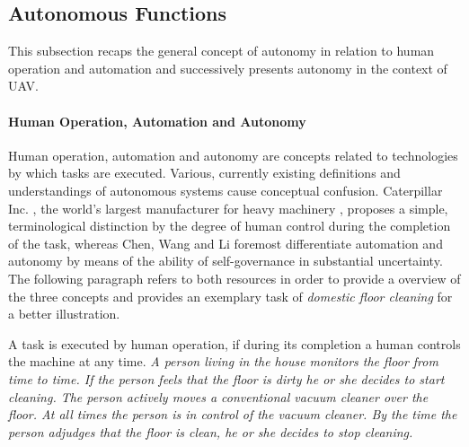 \subsection{Autonomous Functions} \label{sub:UAVs_with_autonomous_functions}

This subsection recaps the general concept of autonomy in relation to human operation and automation
and successively presents autonomy in the context of UAV.


\paragraph{Human Operation, Automation and Autonomy}

Human operation, automation and autonomy are concepts related to technologies by which tasks are executed.
Various, currently existing definitions and understandings of autonomous systems cause conceptual confusion. \cite{Williams}
Caterpillar Inc. \cite{Caterpillar}, the world's largest manufacturer for heavy machinery \cite{Yang2009}, 
proposes a simple, terminological distinction by the degree of human control during the completion of the task,
whereas Chen, Wang and Li \cite{Chen2009} foremost differentiate automation and autonomy 
by means of the ability of self-governance in substantial uncertainty.
The following paragraph refers to both resources in order to provide a overview of the three concepts
and provides an exemplary task of \textit{domestic floor cleaning} for a better illustration.

A task is executed by human operation, if during its completion a human controls the machine at any time. 
\textit{A person living in the house monitors the floor from time to time. 
If the person feels that the floor is dirty he or she decides to start cleaning.
The person actively moves a conventional vacuum cleaner over the floor. At all times the person is in control of the vacuum cleaner.
By the time the person adjudges that the floor is clean, he or she decides to stop cleaning.}

